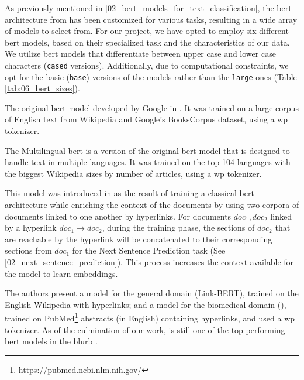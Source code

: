 \label{06_bert_models}



As previously mentioned in \headerName{} \ref{02_bert_models_for_text_classification}, the \gls{bert} architecture from  has been customized for various tasks, resulting in a wide array of models to select from. For our project, we have opted to employ six different \gls{bert} models, based on their specialized task and the characteristics of our data.
We utilize \gls{bert} models that differentiate between upper case and lower case characters (\texttt{cased} versions). Additionally, due to computational constraints, we opt for the basic (\texttt{base}) versions of the models rather than the \texttt{large} ones (Table \ref{tab:06_bert_sizes}).




\label{06_bert_base}
The original \gls{bert} model developed by Google in . It was trained on a large corpus of English text from Wikipedia and Google’s BooksCorpus dataset, using a \gls{wp} tokenizer.

\label{06_bert_multilingual}
The Multilingual \gls{bert}  is a version of the original \gls{bert} model that is designed to handle text in multiple languages. It was trained on the top 104 languages with the biggest Wikipedia sizes by number of articles, using a \gls{wp} tokenizer. 

\label{06_bert_biolinkbert}

This model was introduced in  as the result of training a classical \gls{bert} architecture while enriching the context of the documents by using two corpora of documents linked to one another by hyperlinks. For documents $doc_1, doc_2$ linked by a hyperlink $doc_1 \to doc_2$, during the training phase, the sections of $doc_2$ that are reachable by the hyperlink will be concatenated to their corresponding sections from $doc_1$ for the Next Sentence Prediction task (See \headerName{} \ref{02_next_sentence_prediction}). This process increases the context available for the model to learn embeddings. 

The authors present a model for the general domain (Link-BERT), trained on the English Wikipedia with hyperlinks; and a model for the biomedical domain (\bertbiolinkbert{}), trained on PubMed\footnote{\url{https://pubmed.ncbi.nlm.nih.gov/}} abstracts (in English) containing hyperlinks, and used a \gls{wp} tokenizer. As of the culmination of our work, \bertbiolinkbert{} is still one of the top performing \gls{bert} models in the \gls{blurb} .



